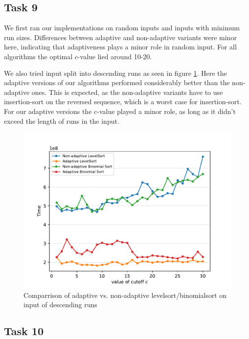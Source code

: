 \documentclass[11pt, a4paper]{article}
\begin{document}
\subsection{Task 9}

We first ran our implementations on random inputs and inputs with minimum run sizes. Differences between adaptive and non-adaptive variants were minor here, indicating that adaptiveness plays a minor role in random input. For all algorithms the optimal $c$-value lied around 10-20.

We also tried input split into descending runs as seen in figure \ref{fig:descRuns}. Here the adaptive versions of our algorithms performed considerably better than the non-adaptive ones. This is expected, as the non-adaptive variants have to use insertion-sort on the reversed sequence, which is a worst case for insertion-sort. For our adaptive versions the c-value played a minor role, as long as it didn't exceed the length of runs in the input.

\begin{figure}[h]
  \begin{center}
    \includegraphics[width=\textwidth]{plot/t9more_runs_time_plot.pdf}
    \caption{Comparrison of adaptive vs. non-adaptive levelsort/binomialsort on input of descending runs}
    \label{fig:descRuns}
  \end{center}
\end{figure}


\subsection{Task 10}
\end{document}
